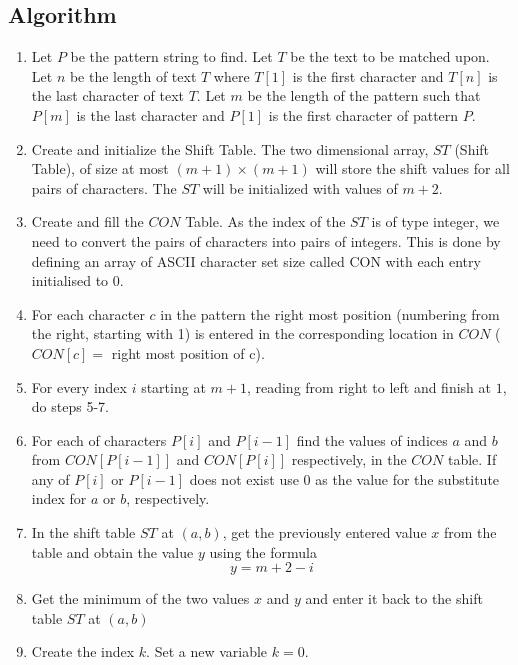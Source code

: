 \subsection{Algorithm}
\begin{enumerate}
\item Let $P$ be the pattern string to find. Let $T$ be the text to be matched upon. Let $n$ be the length of text $T$ where $T[1]$ is the first character and $T[n]$ is the last character of text $T$. Let $m$ be the length of the pattern such that $P[m]$ is the last character and $P[1]$ is the first character of pattern $P$.

\item Create and initialize the Shift Table. The two dimensional array, $ST$ (Shift Table), of size at most $(m+1)\times(m+1)$ will store the shift values for all pairs of characters. The $ST$ will be initialized with values of $m+2$.

\item Create and fill the $CON$ Table. As the index of the $ST$ is of type integer, we need to convert the pairs of characters into pairs of integers. This is done by defining an array of ASCII character set size called CON with each entry initialised to $0$.

\item For each character $c$ in the pattern the right most position (numbering from the right, starting with 1) is entered in the corresponding location in $CON$ ($CON[c]=$ right most position of c).

\item For every index $i$ starting at $m+1$, reading from right to left and finish at $1$, do steps 5-7.

	\item For each of characters $P[i]$ and $P[i-1]$ find the values of indices $a$ and $b$ from $CON[P[i-1]]$ and $CON[P[i]]$ respectively, in the $CON$ table.  If any of $P[i]$ or $P[i-1]$ does not exist use $0$ as the value for the substitute index for $a$ or $b$, respectively.

	\item In the shift table $ST$ at $(a, b)$, get the previously entered value $x$ from the table and obtain the value $y$ using the formula $$ y = m+2-i $$

	\item Get the minimum of the two values $x$ and $y$ and enter it back to the shift table $ST$ at $(a, b)$

\item Create the index $k$. Set a new variable $k=0$.


\end{enumerate}

